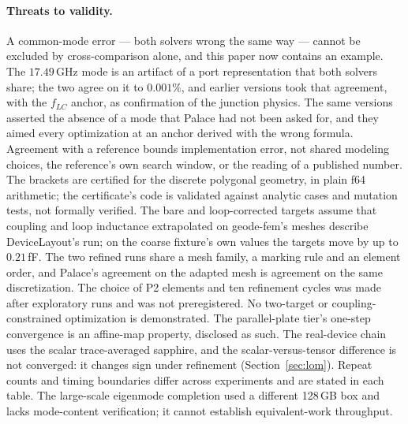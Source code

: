 \documentclass{anvil-paper}
\begin{document}
\paragraph{Threats to validity.}
A common-mode error --- both solvers wrong the same way --- cannot be
excluded by cross-comparison alone, and this paper now contains an
example. The $17.49$\,GHz mode is an artifact of a port representation
that both solvers share; the two agree on it to $0.001\%$, and earlier
versions took that agreement, with the $f_{LC}$ anchor, as confirmation
of the junction physics. The same versions asserted the absence of a
mode that Palace had not been asked for, and they aimed every
optimization at an anchor derived with the wrong formula. Agreement
with a reference bounds implementation error, not shared modeling
choices, the reference's own search window, or the reading of a
published number. The brackets are certified for the discrete
polygonal geometry, in plain f64 arithmetic; the certificate's code is
validated against analytic cases and mutation tests, not formally
verified. The bare and loop-corrected targets assume that coupling and
loop inductance extrapolated on geode-fem's meshes describe
DeviceLayout's run; on the coarse fixture's own values the targets move
by up to $0.21$\,fF. The two refined runs share a mesh family, a marking
rule and an element order, and Palace's agreement on the adapted mesh is
agreement on the same discretization. The choice of P2 elements and ten
refinement cycles was made after exploratory runs and was not
preregistered. No two-target or coupling-constrained optimization is
demonstrated. The
parallel-plate tier's one-step convergence is an affine-map property,
disclosed as such. The real-device chain uses the scalar trace-averaged
sapphire, and the scalar-versus-tensor difference is not converged: it
changes sign under refinement (Section~\ref{sec:lom}).
Repeat counts and timing boundaries differ across experiments and are
stated in each table. The large-scale eigenmode completion used a
different 128\,GB box and lacks mode-content verification; it cannot
establish equivalent-work throughput.
\end{document}
